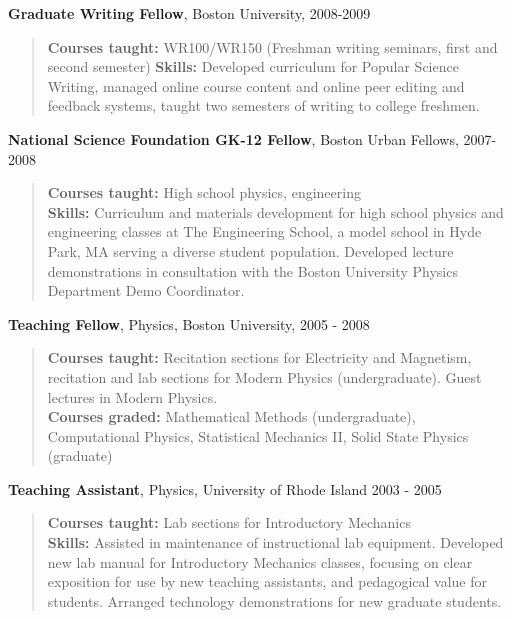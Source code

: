 \documentclass[letterpaper]{article}
\renewenvironment{itemize}{
  \begin{list}{}{
    \setlength{\leftmargin}{1em}
  }
}{
  \end{list}
}
\begin{document}
\begin{itemize}
	\item \textbf{Graduate Writing Fellow}, Boston University, 2008-2009 
\vspace{-0.5em}
\begin{quote}\textbf{Courses taught:} WR100/WR150 (Freshman writing seminars, first and second semester)  
 	\textbf{Skills:} Developed curriculum for Popular Science Writing, managed online course content and online peer editing and feedback systems, taught two semesters of writing to college freshmen.
  \end{quote}
	\item \textbf{National Science Foundation GK-12 Fellow}, Boston Urban Fellows, 2007-2008 
\vspace{-0.5em}
\begin{quote}\textbf{Courses taught:} High school physics, engineering  \\
	\textbf{Skills:} Curriculum and materials development for high school physics and engineering classes at The Engineering School, a model school in Hyde Park, MA serving a diverse student population.  Developed lecture demonstrations in consultation with the Boston University Physics Department Demo Coordinator.  \end{quote}
	\item \textbf{Teaching Fellow}, Physics, Boston University, 2005 - 2008
\vspace{-0.5em}
\begin{quote}\textbf{Courses taught:} Recitation sections for Electricity and Magnetism, recitation and lab sections for Modern Physics (undergraduate). Guest lectures in Modern Physics.  \\
	\textbf{Courses graded:} Mathematical Methods (undergraduate), Computational Physics, Statistical Mechanics II, Solid State Physics (graduate)   
\end{quote}
	\item \textbf{Teaching Assistant}, Physics, University of Rhode Island 2003 - 2005 
\vspace{-0.5em}
\begin{quote}\textbf{Courses taught:} Lab sections for Introductory Mechanics   \\
	\textbf{Skills:} Assisted in maintenance of instructional lab equipment.  Developed new lab manual for Introductory Mechanics classes, focusing on clear exposition for use by new teaching assistants, and pedagogical value for students.  Arranged technology demonstrations for new graduate students. 
\end{quote}

\end{itemize}
\end{document}
